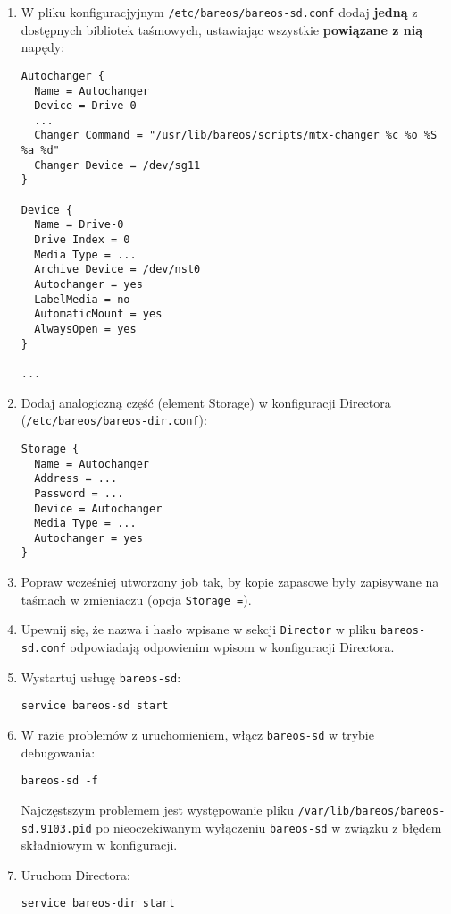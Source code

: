 \documentclass[polish]{article}
\begin{document}
\begin{enumerate}

\item W pliku konfiguracjyjnym \texttt{/etc/bareos/bareos-sd.conf} dodaj \textbf{jedną} z dostępnych bibliotek taśmowych, ustawiając wszystkie \textbf{powiązane z nią} napędy:
\begin{verbatim}
Autochanger {
  Name = Autochanger
  Device = Drive-0
  ...
  Changer Command = "/usr/lib/bareos/scripts/mtx-changer %c %o %S %a %d"
  Changer Device = /dev/sg11
}

Device {
  Name = Drive-0
  Drive Index = 0
  Media Type = ...
  Archive Device = /dev/nst0
  Autochanger = yes
  LabelMedia = no
  AutomaticMount = yes
  AlwaysOpen = yes
}

...
\end{verbatim}

\item Dodaj analogiczną część (element Storage) w konfiguracji Directora (\texttt{/etc/bareos/bareos-dir.conf}):
\begin{verbatim}
Storage {
  Name = Autochanger
  Address = ...
  Password = ...
  Device = Autochanger
  Media Type = ...
  Autochanger = yes
}
\end{verbatim}

\item Popraw wcześniej utworzony job tak, by kopie zapasowe były zapisywane na taśmach w zmieniaczu (opcja \texttt{Storage =}).

\item Upewnij się, że nazwa i hasło wpisane w sekcji \texttt{Director} w pliku \texttt{bareos-sd.conf} odpowiadają odpowienim wpisom w konfiguracji Directora.

\item Wystartuj usługę \texttt{bareos-sd}:
\begin{verbatim}
service bareos-sd start
\end{verbatim}

\item W razie problemów z uruchomieniem, włącz \texttt{bareos-sd} w trybie debugowania:
\begin{verbatim}
bareos-sd -f
\end{verbatim}
Najczęstszym problemem jest występowanie pliku \texttt{/var/lib/bareos/bareos-sd.9103.pid} po nieoczekiwanym wyłączeniu \texttt{bareos-sd} w związku z błędem składniowym w konfiguracji.

\item Uruchom Directora:
\begin{verbatim}
service bareos-dir start
\end{verbatim}


\end{enumerate}
\end{document}
